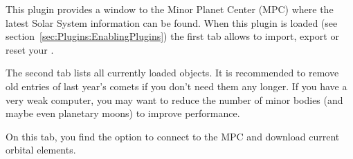 This plugin provides a window to the Minor Planet Center (MPC) where the
latest Solar System information can be found. When this plugin is
loaded (see section~\ref{sec:Plugins:EnablingPlugins}) the first tab
allows to import, export or reset your .

The second tab lists all currently loaded objects.  It is recommended
to remove old entries of last year's comets if you don't need them any
longer.
If you have a very weak computer, you may want to reduce the number of
minor bodies (and maybe even planetary moons) to improve performance.

On this tab, you find the option to connect to the MPC and download current orbital elements. 




